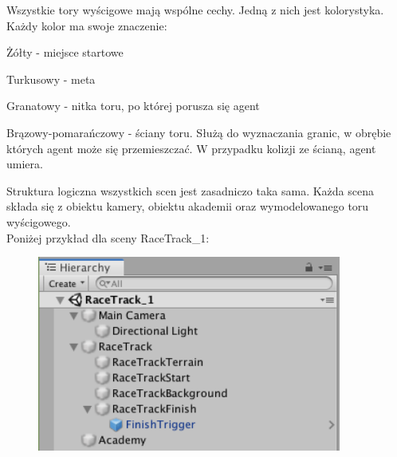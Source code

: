Wszystkie tory wyścigowe mają wspólne cechy. Jedną z nich jest kolorystyka. Każdy kolor ma swoje znaczenie:
\begin{itemize*}
\item Żółty - miejsce startowe
\item Turkusowy - meta
\item Granatowy - nitka toru, po której porusza się agent
\item Brązowy-pomarańczowy - ściany toru. Służą do wyznaczania granic, w obrębie których agent może się przemieszczać. W przypadku kolizji ze ścianą, agent umiera.
\end{itemize*}

Struktura logiczna wszystkich scen jest zasadniczo taka sama. Każda scena składa się z obiektu kamery, obiektu akademii oraz wymodelowanego toru wyścigowego. \\
Poniżej przykład dla sceny RaceTrack\_1:
\vspace{0.5cm}
\begin{figure}[H]
\centering
\includegraphics[width=10cm]{resources/figures/scene_structure.png}
\end{figure}

